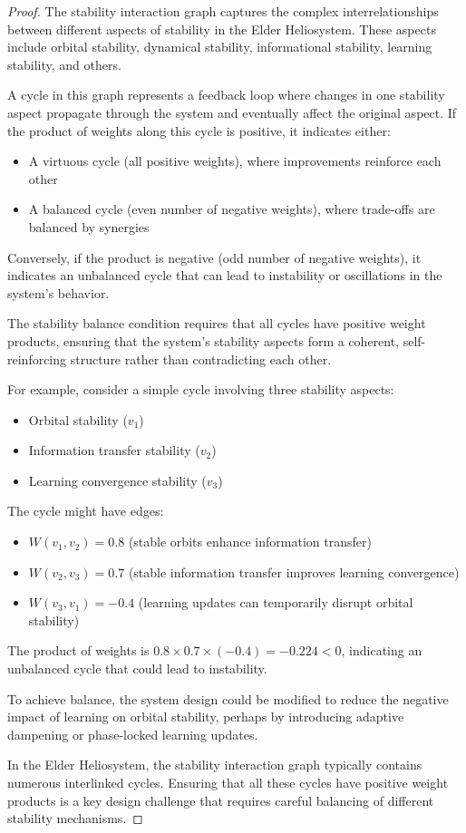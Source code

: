 \begin{proof}
The stability interaction graph captures the complex interrelationships between different aspects of stability in the Elder Heliosystem. These aspects include orbital stability, dynamical stability, informational stability, learning stability, and others.

A cycle in this graph represents a feedback loop where changes in one stability aspect propagate through the system and eventually affect the original aspect. If the product of weights along this cycle is positive, it indicates either:
\begin{itemize}
    \item A virtuous cycle (all positive weights), where improvements reinforce each other
    \item A balanced cycle (even number of negative weights), where trade-offs are balanced by synergies
\end{itemize}

Conversely, if the product is negative (odd number of negative weights), it indicates an unbalanced cycle that can lead to instability or oscillations in the system's behavior.

The stability balance condition requires that all cycles have positive weight products, ensuring that the system's stability aspects form a coherent, self-reinforcing structure rather than contradicting each other.

For example, consider a simple cycle involving three stability aspects:
\begin{itemize}
    \item Orbital stability ($v_1$)
    \item Information transfer stability ($v_2$)
    \item Learning convergence stability ($v_3$)
\end{itemize}

The cycle might have edges:
\begin{itemize}
    \item $W(v_1, v_2) = 0.8$ (stable orbits enhance information transfer)
    \item $W(v_2, v_3) = 0.7$ (stable information transfer improves learning convergence)
    \item $W(v_3, v_1) = -0.4$ (learning updates can temporarily disrupt orbital stability)
\end{itemize}

The product of weights is $0.8 \times 0.7 \times (-0.4) = -0.224 < 0$, indicating an unbalanced cycle that could lead to instability.

To achieve balance, the system design could be modified to reduce the negative impact of learning on orbital stability, perhaps by introducing adaptive dampening or phase-locked learning updates.

In the Elder Heliosystem, the stability interaction graph typically contains numerous interlinked cycles. Ensuring that all these cycles have positive weight products is a key design challenge that requires careful balancing of different stability mechanisms.
\end{proof}

